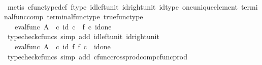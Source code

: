 \begin{isabellebody}
\ \ \ \ \ \ \ \ \ \isamarkupfalse%
\ {\isacharparenleft}{\kern0pt}metis\ cfunc{\isacharunderscore}{\kern0pt}type{\isacharunderscore}{\kern0pt}def\ f{\isacharunderscore}{\kern0pt}type\ id{\isacharunderscore}{\kern0pt}left{\isacharunderscore}{\kern0pt}unit\ id{\isacharunderscore}{\kern0pt}right{\isacharunderscore}{\kern0pt}unit\ id{\isacharunderscore}{\kern0pt}type\ one{\isacharunderscore}{\kern0pt}unique{\isacharunderscore}{\kern0pt}element\ terminal{\isacharunderscore}{\kern0pt}func{\isacharunderscore}{\kern0pt}comp\ terminal{\isacharunderscore}{\kern0pt}func{\isacharunderscore}{\kern0pt}type\ true{\isacharunderscore}{\kern0pt}func{\isacharunderscore}{\kern0pt}type{\isacharparenright}{\kern0pt}\isanewline
\ \ \ \ \ \ \ \isamarkupfalse%
\ \isamarkupfalse%
\ {\isachardoublequoteopen}{\isachardot}{\kern0pt}{\isachardot}{\kern0pt}{\isachardot}{\kern0pt}\ {\isacharequal}{\kern0pt}\ eval{\isacharunderscore}{\kern0pt}func\ A\ {\isasymOmega}\ {\isasymcirc}\isactrlsub c\ {\isasymlangle}id{\isacharparenleft}{\kern0pt}{\isasymOmega}{\isacharparenright}{\kern0pt}\ {\isasymcirc}\isactrlsub c\ {\isasymt}{\isacharcomma}{\kern0pt}\ f\ {\isasymcirc}\isactrlsub c\ id{\isacharparenleft}{\kern0pt}one{\isacharparenright}{\kern0pt}{\isasymrangle}{\isachardoublequoteclose}\isanewline
\ \ \ \ \ \ \ \ \ \isamarkupfalse%
\ {\isacharparenleft}{\kern0pt}typecheck{\isacharunderscore}{\kern0pt}cfuncs{\isacharcomma}{\kern0pt}\ simp\ add{\isacharcolon}{\kern0pt}\ id{\isacharunderscore}{\kern0pt}left{\isacharunderscore}{\kern0pt}unit{}\ id{\isacharunderscore}{\kern0pt}right{\isacharunderscore}{\kern0pt}unit{}{\isacharparenright}{\kern0pt}\isanewline
\ \ \ \ \ \ \ \isamarkupfalse%
\ \isamarkupfalse%
\ {\isachardoublequoteopen}{\isachardot}{\kern0pt}{\isachardot}{\kern0pt}{\isachardot}{\kern0pt}\ {\isacharequal}{\kern0pt}\ eval{\isacharunderscore}{\kern0pt}func\ A\ {\isasymOmega}\ {\isasymcirc}\isactrlsub c\ {\isacharparenleft}{\kern0pt}id{\isacharparenleft}{\kern0pt}{\isasymOmega}{\isacharparenright}{\kern0pt}\ {\isasymtimes}\isactrlsub f\ f{\isacharparenright}{\kern0pt}\ {\isasymcirc}\isactrlsub c\ {\isasymlangle}{\isasymt}{\isacharcomma}{\kern0pt}\ id{\isacharparenleft}{\kern0pt}one{\isacharparenright}{\kern0pt}{\isasymrangle}{\isachardoublequoteclose}\isanewline
\ \ \ \ \ \ \ \ \ \isamarkupfalse%
\ {\isacharparenleft}{\kern0pt}typecheck{\isacharunderscore}{\kern0pt}cfuncs{\isacharcomma}{\kern0pt}\ simp\ add{\isacharcolon}{\kern0pt}\ cfunc{\isacharunderscore}{\kern0pt}cross{\isacharunderscore}{\kern0pt}prod{\isacharunderscore}{\kern0pt}comp{\isacharunderscore}{\kern0pt}cfunc{\isacharunderscore}{\kern0pt}prod{\isacharparenright}{\kern0pt}\isanewline

\end{isabellebody}
